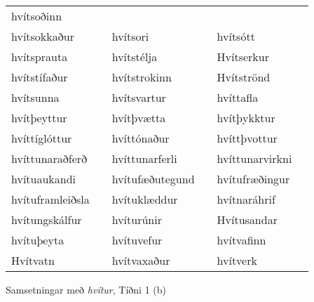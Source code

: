\documentclass{../litmal.tex}{subfiles}
\begin{document}
\begin{wordlist}[H]
\begin{tcolorbox}
\begin{tabular}{BlBlBl}
		hvítsoðinn	&		\\  %
		hvítsokkaður & 		& 
		hvítsori		&		& 
		hvítsótt		&		\\  %
		hvítsprauta	&		& 
		hvítstélja		&		& 
		Hvítserkur	&		\\  %
		hvítstífaður	&		& 
		hvítstrokinn	&		& 
		Hvítströnd	&		\\  %
		hvítsunna	&		& 
		hvítsvartur	&		& 
		hvíttafla		&		\\  %
		hvítþeyttur	&		& 
		hvítþvætta	&		& 
		hvítþykktur	&		\\  %
		hvíttíglóttur	&		& 
		hvíttónaður	&		& 
		hvíttþvottur	&		\\  %
		hvíttunaraðferð & 	& 
		hvíttunarferli	&		& 
		hvíttunarvirkni & 		\\  %
		hvítuaukandi	&		& 
		hvítufæðutegund & 	& 
		hvítufræðingur &		\\  %
		hvítuframleiðsla & 	& 
		hvítuklæddur	 & 		& 	
		hvítnaráhrif	&		\\  %
		hvítungskálfur & 		& 
		hvíturúnir	&		& 
		Hvítusandar	&		\\  %
		hvítuþeyta	&		& 
		hvítuvefur	&		& 
		hvítvafinn	&		\\  %
		Hvítvatn		&		& 
		hvítvaxaður	&		& 
		hvítverk		&		  %
	\end{tabular}
\end{tcolorbox}
	\caption{Samsetningar með \textit{hvítur}, Tíðni 1 (b)}
	\label{listi:hvitt:1b}
\end{wordlist}		
\end{document}
